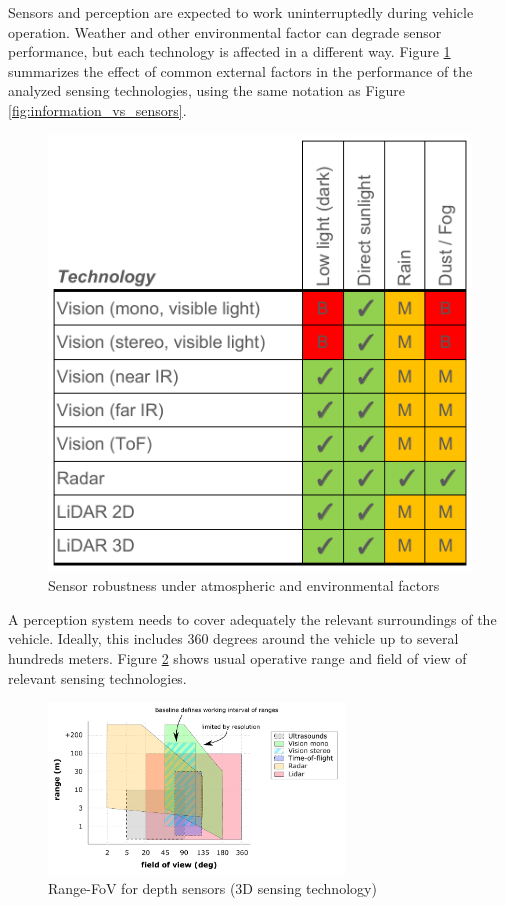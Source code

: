 Sensors and perception are expected to work uninterruptedly during vehicle 
operation. Weather and other environmental factor can degrade sensor
performance, but each technology is affected in a different way. 
Figure \ref{fig:sensors-environ} summarizes the effect of common external
factors in the performance of the analyzed sensing technologies, using the
same notation as Figure \ref{fig:information_vs_sensors}.

\begin{figure}[h]
\centering
\includegraphics[width=0.68\linewidth]{"img/sensors_atmospheric_conditions"}
\caption{Sensor robustness under atmospheric and environmental factors}
\label{fig:sensors-environ}
\end{figure}

A perception system needs to cover adequately the relevant surroundings of the
vehicle. Ideally, this includes 360 degrees around the vehicle up to several
hundreds meters. Figure \ref{fig:range-fov} shows usual operative range and
field of view of relevant sensing technologies. 

\begin{figure}[h]
    \centering
    \includegraphics[width=0.7\textwidth]{"img/plot_range-fov"}
    \caption{Range-FoV for depth sensors (3D sensing technology)}
    \label{fig:range-fov}
\end{figure}

